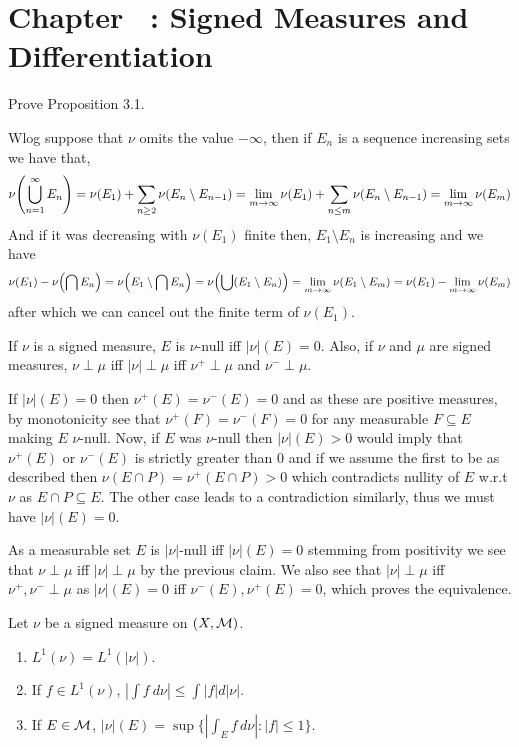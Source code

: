 \documentclass[12pt,a4paper]{article}
\begin{document}
\section*{Chapter \thesection\ : Signed Measures and Differentiation}
\begin{problem}\label{prob:3-1}
Prove Proposition 3.1.
\end{problem}
\begin{solution}
Wlog suppose that $\nu$ omits the value $-\infty$, then if $E_n$ is a sequence increasing sets we have that,
\[
	\nu \qty(\bigcup_{n=1}^\infty E_n)=\nu(E_1)+ \sum_{n\geq 2}\nu(E_n\setminus E_{n-1})=\lim_{m\to\infty} \nu(E_1)+ \sum_{n\leq m}\nu(E_n\setminus E_{n-1})=\lim_{m\to\infty}\nu(E_m)
\]
And if it was decreasing with $\nu(E_1)$ finite then, $E_1\setminus E_n$ is increasing and we have
\[
	\nu(E_1)-\nu \qty(\bigcap E_n)=\nu \qty(E_1\setminus\bigcap E_n)=\nu \qty(\bigcup(E_1\setminus E_n))=\lim_{m\to\infty}\nu(E_1\setminus E_m)=\nu(E_1)- \lim_{m\to\infty}\nu(E_m)
\]
after which we can cancel out the finite term of $\nu(E_1)$.
\end{solution}
\begin{problem}\label{prob:3-2}
If $\nu$ is a signed measure, $E$ is $\nu$-null iff $|\nu|(E)=0$. Also, if $\nu$ and $\mu$ are signed measures, $\nu\perp\mu$ iff $|\nu|\perp\mu$ iff $\nu^{+}\perp\mu$ and $\nu^{-}\perp\mu$.
\end{problem}
\begin{solution}
If $|\nu|(E)=0$ then $\nu^+(E)=\nu^-(E)=0$ and as these are positive measures, by monotonicity see that $\nu^+(F)=\nu^-(F)=0$ for any measurable $F\subseteq E$ making $E$ $\nu$-null. 
Now, if $E$ was $\nu$-null then $|\nu|(E)>0$ would imply that $\nu^+(E)$ or $\nu^-(E)$ is strictly greater than $0$ and if we assume the first to be as described then $\nu(E\cap P)=\nu^+(E\cap P)>0$ which contradicts nullity of $E$ w.r.t $\nu$ as $E\cap P \subseteq E$. 
The other case leads to a contradiction similarly, thus we must have $|\nu|(E)=0$. 

As a measurable set $E$ is $|\nu|$-null iff $|\nu|(E)=0$ stemming from positivity we see that $\nu\perp\mu$ iff $|\nu|\perp\mu$ by the previous claim. 
We also see that $|\nu|\perp\mu$ iff $\nu^+,\nu^-\perp\mu$ as $|\nu|(E)=0$ iff $\nu^-(E),\nu^+(E)=0$, which proves the equivalence.
\end{solution}
\begin{problem}\label{prob:3-3}
Let $\nu$ be a signed measure on $(X, \mathcal{M})$.
\begin{enumerate}[label=\alph*.]
    \item $L^{1}(\nu)=L^{1}(|\nu|)$.
    \item If $f\in L^{1}(\nu)$, $|\int f~d\nu|\le\int|f|d|\nu|$.
    \item If $E\in\mathcal{M}$, $|\nu|(E) = \sup \{ |\int_E f\, d\nu| : |f| \le 1 \}$.
\end{enumerate}
\end{problem}
\end{document}
